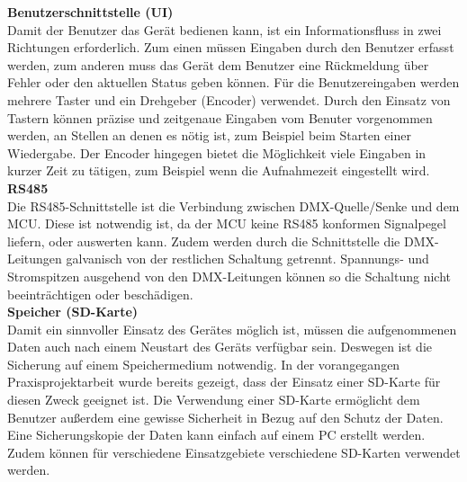 \textbf{Benutzerschnittstelle (UI)}\\
Damit der Benutzer das Gerät bedienen kann, ist ein Informationsfluss in zwei Richtungen erforderlich. Zum einen müssen Eingaben durch den Benutzer erfasst werden, zum anderen muss das Gerät dem Benutzer eine Rückmeldung über Fehler oder den aktuellen Status geben können. Für die Benutzereingaben werden mehrere Taster und ein Drehgeber (Encoder) verwendet. Durch den Einsatz von Tastern können präzise und zeitgenaue Eingaben vom Benuter vorgenommen werden, an Stellen an denen es nötig ist, zum Beispiel beim Starten einer Wiedergabe. Der Encoder hingegen bietet die Möglichkeit viele Eingaben in kurzer Zeit zu tätigen, zum Beispiel wenn die Aufnahmezeit eingestellt wird.\\
\newline
\textbf{RS485}\\
Die RS485-Schnittstelle ist die Verbindung zwischen DMX-Quelle/Senke und dem MCU. Diese ist notwendig ist, da der MCU keine RS485 konformen Signalpegel liefern, oder auswerten kann. Zudem werden durch die Schnittstelle die DMX-Leitungen galvanisch von der restlichen Schaltung getrennt. Spannungs- und Stromspitzen ausgehend von den DMX-Leitungen können so die Schaltung nicht beeinträchtigen oder beschädigen.\\
\newline
\textbf{Speicher (SD-Karte)}\\
Damit ein sinnvoller Einsatz des Gerätes möglich ist, müssen die aufgenommenen Daten auch nach einem Neustart des Geräts verfügbar sein. Deswegen ist die Sicherung auf einem Speichermedium notwendig. In der vorangegangen Praxisprojektarbeit wurde bereits gezeigt, dass der Einsatz einer SD-Karte für diesen Zweck geeignet ist. Die Verwendung einer SD-Karte ermöglicht dem Benutzer außerdem eine gewisse Sicherheit in Bezug auf den Schutz der Daten. Eine Sicherungskopie der Daten kann einfach auf einem PC erstellt werden. Zudem können für verschiedene Einsatzgebiete verschiedene SD-Karten verwendet werden.